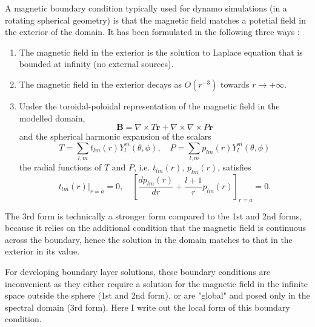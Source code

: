 
A magnetic boundary condition typically used for dynamo simulations (in a rotating spherical geometry) is that the magnetic field matches a potetial field in the exterior of the domain. It has been formulated in the following three ways \citep{roberts_803_2015}:

\begin{enumerate}
    \item The magnetic field in the exterior is the solution to Laplace equation that is bounded at infinity (no external sources).
    \item The magnetic field in the exterior decays as $O(r^{-3})$ towards $r\rightarrow +\infty$.
    \item Under the toroidal-poloidal representation of the magnetic field in the modelled domain,
    \begin{equation}
        \mathbf{B} = \nabla\times T\mathbf{r} + \nabla\times \nabla\times P\mathbf{r}
    \end{equation}
    and the spherical harmonic expansion of the scalars
    \begin{equation}
        T = \sum_{l,m} t_{lm}(r) Y_l^m(\theta, \phi),\quad 
        P = \sum_{l,m} p_{lm}(r) Y_l^m(\theta, \phi)
    \end{equation}
    the radial functions of $T$ and $P$, i.e. $t_{lm}(r)$, $p_{lm}(r)$, satisfies
    \begin{equation} 
        t_{lm}(r)|_{r=a} = 0, \quad \left[\frac{dp_{lm}(r)}{dr} + \frac{l+1}{r} p_{lm}(r)\right]_{r=a} = 0.
    \end{equation}
\end{enumerate}

The 3rd form is technically a stronger form compared to the 1st and 2nd forms, because it relies on the additional condition that the magnetic field is continuous across the boundary, hence the solution in the domain matches to that in the exterior in its value.

For developing boundary layer solutions, these boundary conditions are inconvenient as they either require a solution for the magnetic field in the infinite space outside the sphere (1st and 2nd form), or are "global" and posed only in the spectral domain (3rd form). Here I write out the local form of this boundary condition.


